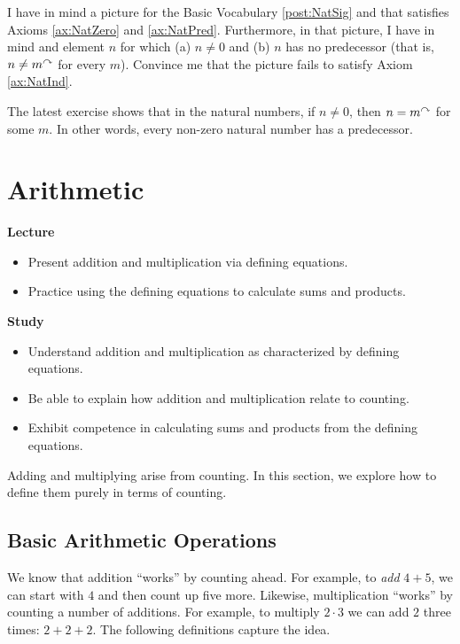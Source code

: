 \begin{exer}
\begin{exercise}
\item\label{exer:cases} I have in mind a picture for the Basic Vocabulary \ref{post:NatSig} and that satisfies Axioms \ref{ax:NatZero}
and \ref{ax:NatPred}. Furthermore, in that picture, I have in mind and element $n$ for which (a) $n\neq 0$
and (b) $n$ has no predecessor (that is, $n\neq m^\curvearrowright$ for every $m$). Convince me that
the picture fails to satisfy Axiom \ref{ax:NatInd}.
\end{exercise}
\end{exer}

The latest exercise shows that in the natural numbers, if $n\neq 0$, then $n = m^\curvearrowright$ for some $m$. In other
words, every non-zero natural number has a predecessor. 


\chapter{Arithmetic}\label{lec:Arithmetic}


\begin{goals}
\tightlists
\noindent\textbf{Lecture}
\begin{itemize}
\item Present addition and multiplication via defining equations.
\item Practice using the defining equations to calculate sums and products.
\end{itemize}

\noindent\textbf{Study}
\begin{itemize}
  \item Understand addition and multiplication as characterized by defining equations.
  \item Be able to explain how addition and multiplication relate to counting.
  \item Exhibit competence in calculating sums and products from the defining equations.
\end{itemize}
\end{goals}

Adding and multiplying arise from counting. In this section, we explore how to define them purely in terms of counting.

\ipadbreak

\section{Basic Arithmetic Operations}

We know that addition ``works'' by counting ahead. For example, to \emph{add} $4+5$, we can start with $4$ and then count up five more. Likewise, multiplication ``works'' by counting a number of additions. For example, to multiply $2\cdot 3$ we can add $2$ three times: $2+2+2$. The following definitions capture the idea.
 
